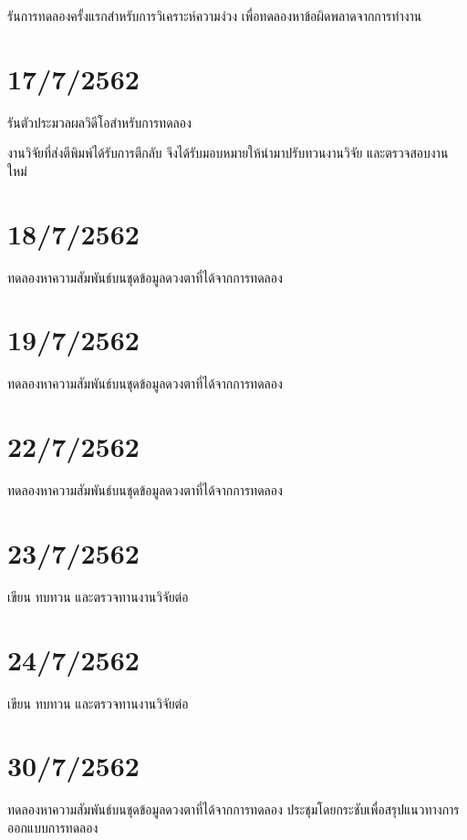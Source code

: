 รันการทดลองครั้งแรกสำหรับการวิเคราะห์ความง่วง เพื่อทดลองหาข้อผิดพลาดจากการทำงาน

\section*{17/7/2562}

รันตัวประมวลผลวิดีโอสำหรับการทดลอง

งานวิจัยที่ส่งตีพิมพ์ได้รับการตีกลับ จึงได้รับมอบหมายให้นำมาปรับทวนงานวิจัย และตรวจสอบงานใหม่

\section*{18/7/2562}

ทดลองหาความสัมพันธ์บนชุดข้อมูลดวงตาที่ได้จากการทดลอง

\section*{19/7/2562}

ทดลองหาความสัมพันธ์บนชุดข้อมูลดวงตาที่ได้จากการทดลอง

\section*{22/7/2562}

ทดลองหาความสัมพันธ์บนชุดข้อมูลดวงตาที่ได้จากการทดลอง

\section*{23/7/2562}

เขียน ทบทวน และตรวจทานงานวิจัยต่อ

\section*{24/7/2562}

เขียน ทบทวน และตรวจทานงานวิจัยต่อ

\section*{30/7/2562}

ทดลองหาความสัมพันธ์บนชุดข้อมูลดวงตาที่ได้จากการทดลอง ประชุมโดยกระชับเพื่อสรุปแนวทางการออกแบบการทดลอง